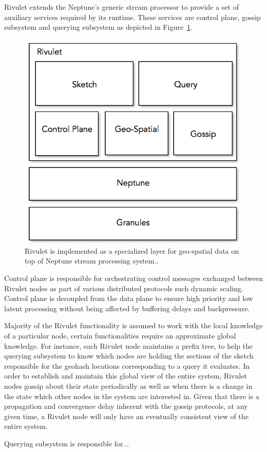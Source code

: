 Rivulet extends the Neptune's generic stream processor to provide a set of auxiliary services required by its runtime.
These services are control plane, gossip subsystem and querying subsystem as depicted in Figure~\ref{fig:rivulet-archi}.
%
\begin{figure}
    \centerline{\includegraphics[scale=0.5]{figures/rivulet-archi.png}}
    \caption{Rivulet is implemented as a specialized layer for geo-spatial data on top of Neptune stream processing system..}
    \label{fig:rivulet-archi}
\end{figure}
%
\begin{description}[leftmargin=*]
	\item[Control plane:] Control plane is responsible for orchestrating control messages exchanged between Rivulet nodes as part of various distributed protocols such dynamic scaling.
	Control plane is decoupled from the data plane to ensure high priority and low latent processing without being affected by buffering delays and backpressure.

	\item[Gossip subsystem:] Majority of the Rivulet functionality is assumed to work with the local knowledge of a particular node, certain functionalities require an approximate global knowledge. 
	For instance, each Rivulet node maintains a prefix tree, to help the querying subsystem to know which nodes are holding the sections of the sketch responsible for the geohash locations corresponding to a query it evaluates. 
	In order to establish and maintain this global view of the entire system, Rivulet nodes gossip about their state periodically as well as when there is a change in the state which other nodes in the system are interested in.
	Given that there is a propagation and convergence delay inherent with the gossip protocols, at any given time, a Rivulet node will only have an eventually consistent view of the entire system.

	\item[Querying Subsystem:] Querying subsystem is responsible for...
\end{description} 

